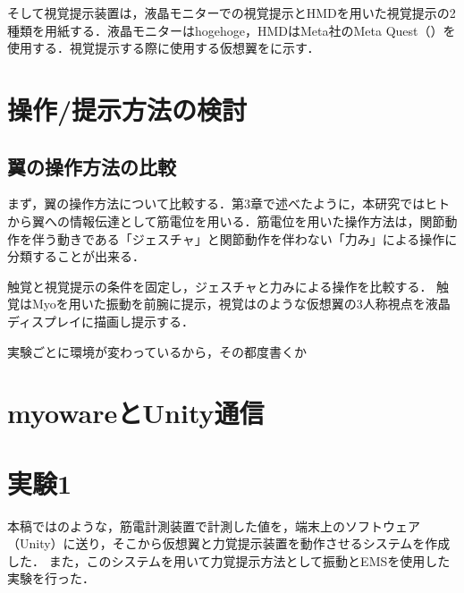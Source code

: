     そして視覚提示装置は，液晶モニターでの視覚提示とHMDを用いた視覚提示の2種類を用紙する．液晶モニターはhogehoge，HMDはMeta社のMeta Quest（）\cite{OculusQuest}を使用する．視覚提示する際に使用する仮想翼をに示す．


\section{操作/提示方法の検討}
    \subsection{翼の操作方法の比較}
        まず，翼の操作方法について比較する．第3章で述べたように，本研究ではヒトから翼への情報伝達として筋電位を用いる．筋電位を用いた操作方法は，関節動作を伴う動きである「ジェスチャ」と関節動作を伴わない「力み」による操作に分類することが出来る．

        触覚と視覚提示の条件を固定し，ジェスチャと力みによる操作を比較する． 触覚はMyoを用いた振動を前腕に提示，視覚はのような仮想翼の3人称視点を液晶ディスプレイに描画し提示する．
    

    実験ごとに環境が変わっているから，その都度書くか

\section{myowareとUnity通信}

\section{}

\section{実験1}
    本稿ではのような，筋電計測装置で計測した値を，端末上のソフトウェア（Unity）に送り，そこから仮想翼と力覚提示装置を動作させるシステムを作成した．
    また，このシステムを用いて力覚提示方法として振動とEMSを使用した実験を行った．

   


    
